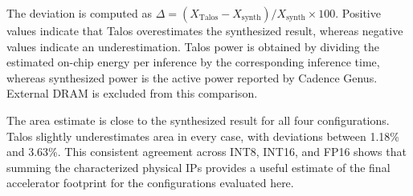 \begin{table}[t]
\centering
\caption{Summary of the deviation between Talos architectural
estimates and synthesized E+A+P accelerator configurations.}
\label{tab:talos_estimation_validation}

\setlength{\tabcolsep}{3.5pt}
\renewcommand{\arraystretch}{1.15}


\vspace{1mm}
\begin{minipage}{0.96\textwidth}
\footnotesize
The deviation is computed as
$\Delta=(X_{\mathrm{Talos}}-X_{\mathrm{synth}})/
X_{\mathrm{synth}}\times100$.
Positive values indicate that Talos overestimates the synthesized
result, whereas negative values indicate an underestimation.
Talos power is obtained by dividing the estimated on-chip energy per
inference by the corresponding inference time, whereas synthesized
power is the active power reported by Cadence Genus.
External DRAM is excluded from this comparison.
\end{minipage}

\end{table}
The area estimate is close to the synthesized result for all four
configurations. Talos slightly underestimates area in every case, with
deviations between 1.18\% and 3.63\%. This consistent agreement across
INT8, INT16, and FP16 shows that summing the characterized physical IPs
provides a useful estimate of the final accelerator footprint for the
configurations evaluated here.

